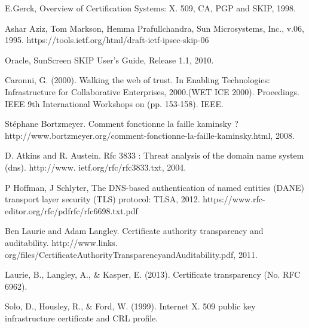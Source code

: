 \documentclass[journal, a4paper]{IEEEtran}
\begin{document}
\nocite{*}

\begin{thebibliography}{99}

 E.Gerck, Overview of Certification Systems: X. 509, CA, PGP and SKIP, 1998.

 Ashar Aziz, Tom Markson, Hemma Prafullchandra, Sun Microsystems, Inc., v.06, 1995. https://tools.ietf.org/html/draft-ietf-ipsec-skip-06

 Oracle, SunScreen SKIP User's Guide, Release 1.1, 2010. %

 Caronni, G. (2000). Walking the web of trust. In Enabling Technologies: Infrastructure for Collaborative Enterprises, 2000.(WET ICE 2000). Proeedings. IEEE 9th International Workshops on (pp. 153-158). IEEE. %

 Stéphane Bortzmeyer. Comment fonctionne la faille kaminsky ? http://www.bortzmeyer.org/comment-fonctionne-la-faille-kaminsky.html, 2008.

 D. Atkins and R. Austein. Rfc 3833 : Threat analysis of the domain name system (dns). http://www.
ietf.org/rfc/rfc3833.txt, 2004.

 P Hoffman, J Schlyter, The DNS-based authentication of named entities (DANE) transport layer security (TLS) protocol: TLSA, 2012. https://www.rfc-editor.org/rfc/pdfrfc/rfc6698.txt.pdf

 Ben Laurie and Adam Langley. Certificate authority transparency and auditability. http://www.links.
org/files/CertificateAuthorityTransparencyandAuditability.pdf, 2011.

 Laurie, B., Langley, A., \& Kasper, E. (2013). Certificate transparency (No. RFC 6962). %

 Solo, D., Housley, R., \& Ford, W. (1999). Internet X. 509 public key infrastructure certificate and CRL profile. %

\end{thebibliography}

\end{document}
